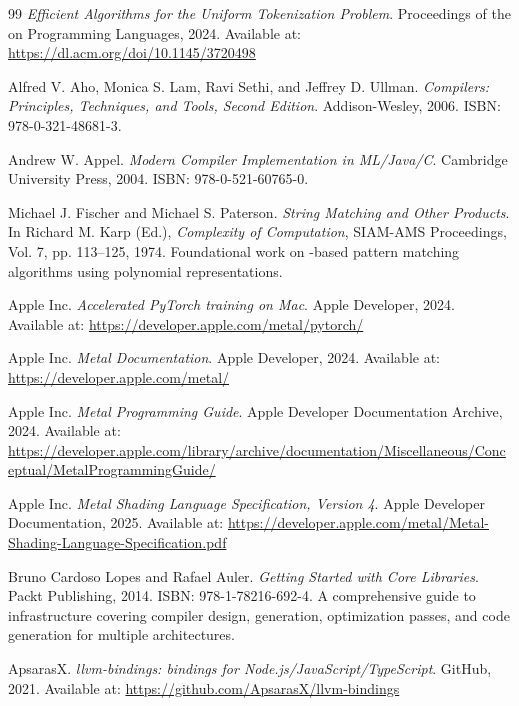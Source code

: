 \backmatter

\begin{thebibliography}{99}
\textit{Efficient Algorithms for the Uniform Tokenization Problem}. Proceedings of the  on Programming Languages, 2024. Available at: \url{https://dl.acm.org/doi/10.1145/3720498}

Alfred V. Aho, Monica S. Lam, Ravi Sethi, and Jeffrey D. Ullman. \textit{Compilers: Principles, Techniques, and Tools, Second Edition}. Addison-Wesley, 2006. ISBN: 978-0-321-48681-3.

Andrew W. Appel. \textit{Modern Compiler Implementation in ML/Java/C}. Cambridge University Press, 2004. ISBN: 978-0-521-60765-0.

Michael J. Fischer and Michael S. Paterson. \textit{String Matching and Other Products}. In Richard M. Karp (Ed.), \textit{Complexity of Computation}, SIAM-AMS Proceedings, Vol. 7, pp. 113–125, 1974. Foundational work on -based pattern matching algorithms using polynomial representations.

Apple Inc. \textit{Accelerated PyTorch training on Mac}. Apple Developer, 2024. Available at: \url{https://developer.apple.com/metal/pytorch/}

Apple Inc. \textit{Metal Documentation}. Apple Developer, 2024. Available at: \url{https://developer.apple.com/metal/}

Apple Inc. \textit{Metal Programming Guide}. Apple Developer Documentation Archive, 2024. Available at: \url{https://developer.apple.com/library/archive/documentation/Miscellaneous/Conceptual/MetalProgrammingGuide/}

Apple Inc. \textit{Metal Shading Language Specification, Version 4}. Apple Developer Documentation, 2025. Available at: \url{https://developer.apple.com/metal/Metal-Shading-Language-Specification.pdf}

Bruno Cardoso Lopes and Rafael Auler. \textit{Getting Started with  Core Libraries}. Packt Publishing, 2014. ISBN: 978-1-78216-692-4. A comprehensive guide to  infrastructure covering compiler design,  generation, optimization passes, and code generation for multiple architectures.

ApsarasX. \textit{llvm-bindings:  bindings for Node.js/JavaScript/TypeScript}. GitHub, 2021. Available at: \url{https://github.com/ApsarasX/llvm-bindings}


\end{thebibliography}

